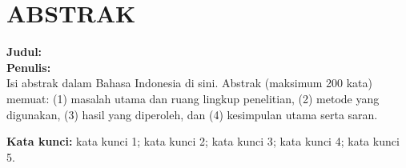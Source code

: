 %
%

\chapter*{ABSTRAK}

\noindent\textbf{Judul:} \ThesisTitle\\
\textbf{Penulis:} \AuthorName\\[0.75\baselineskip]


{Isi abstrak dalam Bahasa Indonesia di sini. Abstrak (maksimum 200 kata) memuat: (1) masalah utama dan ruang lingkup penelitian, (2) metode yang digunakan, (3) hasil yang diperoleh, dan (4) kesimpulan utama serta saran.}


\textbf{Kata kunci:} {kata kunci 1}; {kata kunci 2}; {kata kunci 3}; {kata kunci 4}; {kata kunci 5}.
